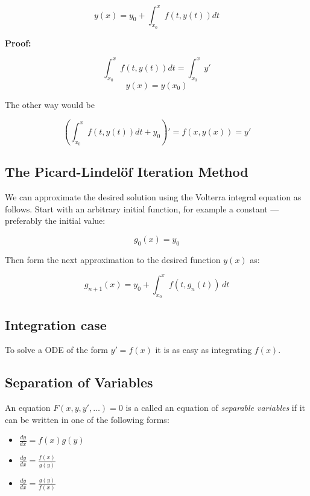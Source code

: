\[
    y(x) = y_0 + \int_{x_0}^{x} f(t, y(t))dt
\]

\textbf{Proof:}

\[
    \int_{x_0}^{x} f(t, y(t))dt = \int_{x_0}^{x} y'
\]
\[
    y(x) = y(x_0)
\]

The other way would be

\[
    \left(\int_{x_0}^{x} f(t, y(t))dt + y_0\right)' = f(x, y(x)) = y' 
\]

\QED

\subsection{The Picard-Lindelöf Iteration Method}

We can approximate the desired solution using the Volterra integral equation as follows. 
Start with an arbitrary initial function, for example a constant — preferably the initial value:

\[
    g_0(x) = y_0
\]

Then form the next approximation to the desired function \( y(x) \) as:

\[
    g_{n+1}(x) = y_0 + \int_{x_0}^{x} f(t, g_n(t)) \, dt
\]

\subsection{Integration case}

To solve a ODE of the form \(y' = f(x)\) it is as easy as integrating \(f(x)\).

\subsection{Separation of Variables}

An equation \(F(x,y,y',\dots) = 0\) is a called an equation of \emph{separable variables} if it can
be written in one of the following forms:

\begin{itemize}
    
    \item \(\frac{dy}{dx} = f(x) g(y)\)
    
    \item \(\frac{dy}{dx} = \frac{f(x)}{g(y)}\)
    
    \item \(\frac{dy}{dx} = \frac{g(y)}{f(x)}\)

\end{itemize}

